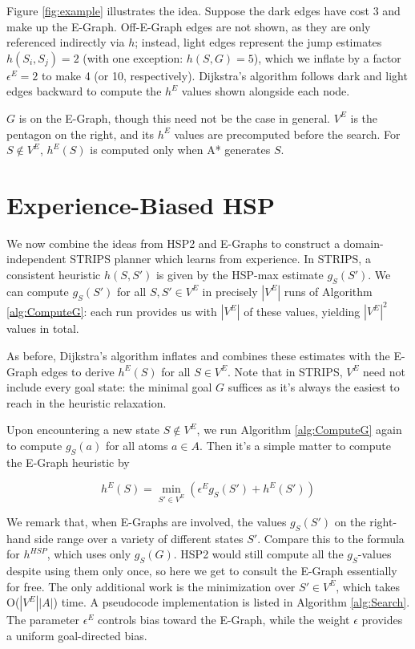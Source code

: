 \documentclass[letterpaper]{article}
\begin{document}
Figure \ref{fig:example} illustrates the idea. Suppose the dark edges have cost 3 and make up the E-Graph. Off-E-Graph edges are not shown, as they are only referenced indirectly via $h$; instead, light edges represent the jump estimates $h(S_i,S_j) = 2$ (with one exception: $h(S,G) = 5$), which we inflate by a factor $\epsilon^E=2$ to make 4 (or 10, respectively). Dijkstra's algorithm follows dark and light edges backward to compute the $h^E$ values shown alongside each node.

$G$ is on the E-Graph, though this need not be the case in general. $V^E$ is the pentagon on the right, and its $h^E$ values are precomputed before the search. For $S\notin V^E$, $h^E(S)$ is computed only when A* generates $S$.

\section{Experience-Biased HSP}

We now combine the ideas from HSP2 and E-Graphs to construct a domain-independent STRIPS planner which learns from experience. In STRIPS, a consistent heuristic $h(S,S')$ is given by the HSP-max estimate $g_S(S')$. We can compute $g_S(S')$ for all $S,S'\in V^E$ in precisely $|V^E|$ runs of Algorithm \ref{alg:ComputeG}: each run provides us with $|V^E|$ of these values, yielding $|V^E|^2$ values in total.

As before, Dijkstra's algorithm inflates and combines these estimates with the E-Graph edges to derive $h^E(S)$ for all $S\in V^E$. Note that in STRIPS, $V^E$ need not include every goal state: the minimal goal $G$ suffices as it's always the easiest to reach in the heuristic relaxation.

Upon encountering a new state $S\notin V^E$, we run Algorithm \ref{alg:ComputeG} again to compute $g_S(a)$ for all atoms $a\in A$. Then it's a simple matter to compute the E-Graph heuristic by

\[h^E(S) = \min_{S'\in V^E} \left( \epsilon^E g_S(S') + h^E(S') \right)\]

We remark that, when E-Graphs are involved, the values $g_S(S')$ on the right-hand side range over a variety of different states $S'$. Compare this to the formula for $h^{HSP}$, which uses only $g_S(G)$. HSP2 would still compute all the $g_S$-values despite using them only once, so here we get to consult the E-Graph essentially for free. The only additional work is the minimization over $S'\in V^E$, which takes O($|V^E||A|$) time. A pseudocode implementation is listed in Algorithm \ref{alg:Search}. The parameter $\epsilon^E$ controls bias toward the E-Graph, while the weight $\epsilon$ provides a uniform goal-directed bias.
\end{document}
